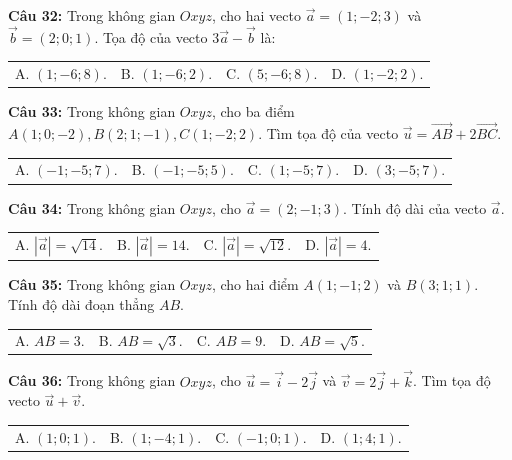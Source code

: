 \documentclass[12pt]{article}
\begin{document}
	\vspace{2mm}
	\noindent \textbf{Câu 32:} Trong không gian $Oxyz$, cho hai vecto $\vec{a} = (1; -2; 3)$ và $\vec{b} = (2; 0; 1)$. Tọa độ của vecto $3\vec{a} - \vec{b}$ là: \\
	\noindent
	\begin{tabular}{p{} p{} p{} p{}}
		A. $(1; -6; 8)$. & B. $(1; -6; 2)$. & C. $(5; -6; 8)$. & D. $(1; -2; 2)$.
	\end{tabular}
	
	\vspace{2mm}
	\noindent \textbf{Câu 33:} Trong không gian $Oxyz$, cho ba điểm $A(1; 0; -2), B(2; 1; -1), C(1; -2; 2)$. Tìm tọa độ của vecto $\vec{u} = \vec{AB} + 2\vec{BC}$. \\
	\noindent
	\begin{tabular}{p{} p{} p{} p{}}
		A. $(-1; -5; 7)$. & B. $(-1; -5; 5)$. & C. $(1; -5; 7)$. & D. $(3; -5; 7)$.
	\end{tabular}
	
	\vspace{2mm}
	\noindent \textbf{Câu 34:} Trong không gian $Oxyz$, cho $\vec{a} = (2; -1; 3)$. Tính độ dài của vecto $\vec{a}$. \\
	\noindent
	\begin{tabular}{p{} p{} p{} p{}}
		A. $|\vec{a}| = \sqrt{14}$. & B. $|\vec{a}| = 14$. & C. $|\vec{a}| = \sqrt{12}$. & D. $|\vec{a}| = 4$.
	\end{tabular}
	
	\vspace{2mm}
	\noindent \textbf{Câu 35:} Trong không gian $Oxyz$, cho hai điểm $A(1; -1; 2)$ và $B(3; 1; 1)$. Tính độ dài đoạn thẳng $AB$. \\
	\noindent
	\begin{tabular}{p{} p{} p{} p{}}
		A. $AB = 3$. & B. $AB = \sqrt{3}$. & C. $AB = 9$. & D. $AB = \sqrt{5}$.
	\end{tabular}
	
	\vspace{2mm}
	\noindent \textbf{Câu 36:} Trong không gian $Oxyz$, cho $\vec{u} = \vec{i} - 2\vec{j}$ và $\vec{v} = 2\vec{j} + \vec{k}$. Tìm tọa độ vecto $\vec{u} + \vec{v}$. \\
	\noindent
	\begin{tabular}{p{} p{} p{} p{}}
		A. $(1; 0; 1)$. & B. $(1; -4; 1)$. & C. $(-1; 0; 1)$. & D. $(1; 4; 1)$.
	\end{tabular}
	
\end{document}
